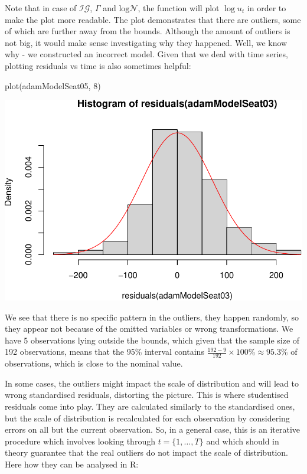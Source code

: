 \documentclass[
]{book}
\newenvironment{Shaded}{\begin{snugshade}}{\end{snugshade}}
\newcommand{\DecValTok}[1]{\textcolor[rgb]{0.00,0.00,0.81}{#1}}
\newcommand{\FunctionTok}[1]{\textcolor[rgb]{0.00,0.00,0.00}{#1}}
\newcommand{\NormalTok}[1]{#1}
\theoremstyle{definition}
\theoremstyle{definition}
\theoremstyle{definition}
\theoremstyle{definition}
\theoremstyle{remark}
\begin{document}
Note that in case of \(\mathcal{IG}\), \(\Gamma\) and \(\mathrm{log}\mathcal{N}\), the function will plot \(\log u_t\) in order to make the plot more readable. The plot demonstrates that there are outliers, some of which are further away from the bounds. Although the amount of outliers is not big, it would make sense investigating why they happened. Well, we know why - we constructed an incorrect model. Given that we deal with time series, plotting residuals vs time is also sometimes helpful:

\begin{Shaded}
\begin{Highlighting}[]
\FunctionTok{plot}\NormalTok{(adamModelSeat05, }\DecValTok{8}\NormalTok{)}
\end{Highlighting}
\end{Shaded}

\includegraphics{adam_files/figure-latex/unnamed-chunk-135-1.pdf}

We see that there is no specific pattern in the outliers, they happen randomly, so they appear not because of the omitted variables or wrong transformations. We have 5 observations lying outside the bounds, which given that the sample size of 192 observations, means that the 95\% interval contains \(\frac{192-9}{192} \times 100 \mathrm{\%} \approx 95.3\mathrm{\%}\) of observations, which is close to the nominal value.

In some cases, the outliers might impact the scale of distribution and will lead to wrong standardised residuals, distorting the picture. This is where studentised residuals come into play. They are calculated similarly to the standardised ones, but the scale of distribution is recalculated for each observation by considering errors on all but the current observation. So, in a general case, this is an iterative procedure which involves looking through \(t=\{1,\dots,T\}\) and which should in theory guarantee that the real outliers do not impact the scale of distribution. Here how they can be analysed in R:
\end{document}
